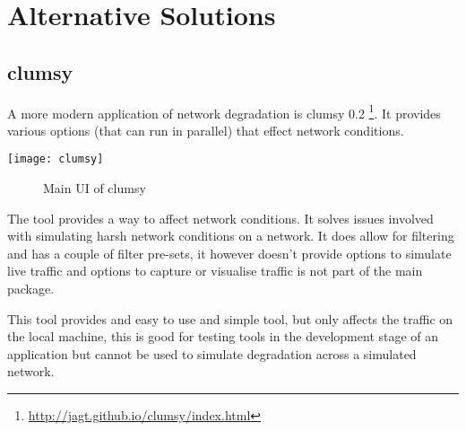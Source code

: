 
\section{Alternative Solutions}


\subsection{clumsy}
A more modern application of network degradation is clumsy 0.2 \footnote{\url{http://jagt.github.io/clumsy/index.html}}. It provides various options (that can run in parallel) that effect network conditions. 

\begin{center}
	\texttt{[image: clumsy]}
	\begin{figure}[h]
		\caption{Main UI of clumsy}
	\end{figure}
\end{center}

The tool provides a way to affect network conditions. It solves issues involved with simulating harsh network conditions on a network. It does allow for filtering and has a couple of filter pre-sets, it however doesn't provide options to simulate live traffic and options to capture or visualise traffic is not part of the main package.

This tool provides and easy to use and simple tool, but only affects the traffic on the local machine, this is good for testing tools in the development stage of an application but cannot be used to simulate degradation across a simulated network.

